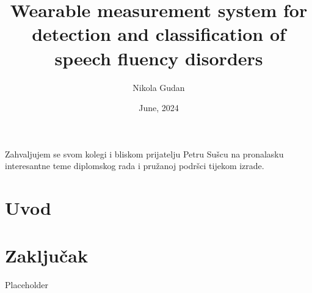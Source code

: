\documentclass[diplomskirad]{fer}
\title{Wearable measurement system for detection and classification of speech fluency disorders}
\author{Nikola Gudan}
\date{June, 2024}
\begin{document}
\maketitle






\begin{zahvale}
  Zahvaljujem se svom kolegi i bliskom prijatelju Petru Sušcu na pronalasku interesantne teme diplomskog rada i pružanoj podršci tijekom izrade.
\end{zahvale}


\mainmatter


\tableofcontents


%
\chapter{Uvod}
\label{pog:uvod}








\chapter{Zaključak}
\label{pog:zakljucak}
Placeholder



\end{document}
